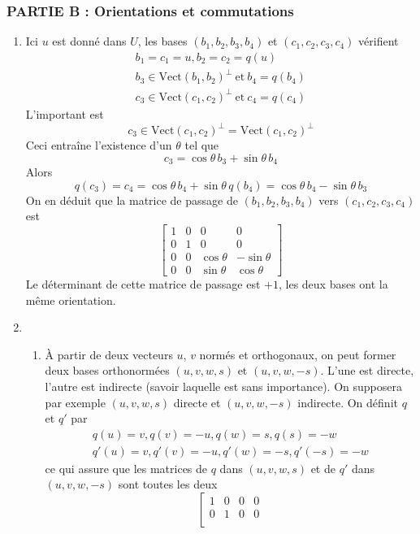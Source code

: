 \subsubsection*{PARTIE B : Orientations et commutations}
\begin{enumerate}
\item Ici $u$ est donné dans $U$, les bases $(b_{1},b_{2},b_{3},b_{4})$ et $(c_{1},c_{2},c_{3},c_{4})$ vérifient 
\begin{eqnarray*}
b_{1}=c_{1}=u,b_{2}=c_{2}=q(u)\\
b_{3}\in \mathrm{Vect}(b_{1},b_{2})^{\bot} \ \mathrm{ et } \ b_{4}=q(b_{4})\\
c_{3}\in \mathrm{Vect}(c_{1},c_{2})^{\bot} \ \mathrm{ et }\ c_{4}=q(c_{4})
\end{eqnarray*}
L'important est 
\[ c_{3}\in \mathrm{Vect}(c_{1},c_{2})^{\bot}=\mathrm{Vect}(c_{1},c_{2})^{\bot}\]
Ceci entraîne l'existence d'un $\theta$ tel que 
\[c_{3}=\cos\theta \,b_{3}+\sin \theta \,b_{4}\]
Alors 
\[q(c_{3})=c_{4}=\cos\theta \,b_{4}+\sin \theta \,q(b_{4})=\cos\theta \,b_{4}-\sin \theta \,b_{3}\]
On en déduit que la matrice de passage de $(b_{1},b_{2},b_{3},b_{4})$ vers $(c_{1},c_{2},c_{3},c_{4})$ est
\[\left [
\begin{array}{cccc}
1 & 0 & 0 & 0\\
0 & 1 & 0 & 0\\
0 & 0 & \cos \theta & -\sin \theta \\
0 & 0 & \sin \theta & \cos \theta 
\end{array}
\right ]
\]
Le déterminant de cette matrice de passage est $+1$, les deux bases ont la même orientation.
\item \begin{enumerate}
\item \`{A} partir de deux vecteurs $u$, $v$ normés et orthogonaux, on peut former deux bases orthonormées $(u,v,w,s)$ et $(u,v,w,-s)$. L'une est directe, l'autre est indirecte (savoir laquelle est sans importance). On supposera par exemple $(u,v,w,s)$ directe et $(u,v,w,-s)$ indirecte. On définit $q$ et $q'$ par 
\begin{eqnarray*}
q(u)=v,q(v)=-u,q(w)=s,q(s)=-w \\
q'(u)=v,q'(v)=-u,q'(w)=-s,q'(-s)=-w
\end{eqnarray*}
ce qui assure que les matrices de $q$ dans $(u,v,w,s)$ et de $q'$ dans $(u,v,w,-s)$ sont toutes les deux 
\[\left [
\begin{array}{cccc}
1 & 0 & 0 & 0\\
0 & 1 & 0 & 0\\

\end{array}\]
\end{enumerate}
\end{enumerate}
